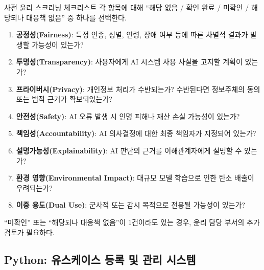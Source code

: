 \begin{practicaltool}{사전 윤리 스크리닝 체크리스트}
각 항목에 대해 ``해당 없음 / 확인 완료 / 미확인 / 해당되나 대응책 없음'' 중 하나를 선택한다.
\begin{enumerate}
    \item \textbf{공정성(Fairness)}: 특정 인종, 성별, 연령, 장애 여부 등에 따른 차별적 결과가 발생할 가능성이 있는가?
    \item \textbf{투명성(Transparency)}: 사용자에게 AI 시스템 사용 사실을 고지할 계획이 있는가?
    \item \textbf{프라이버시(Privacy)}: 개인정보 처리가 수반되는가? 수반된다면 정보주체의 동의 또는 법적 근거가 확보되었는가?
    \item \textbf{안전성(Safety)}: AI 오류 발생 시 인명 피해나 재산 손실 가능성이 있는가?
    \item \textbf{책임성(Accountability)}: AI 의사결정에 대한 최종 책임자가 지정되어 있는가?
    \item \textbf{설명가능성(Explainability)}: AI 판단의 근거를 이해관계자에게 설명할 수 있는가?
    \item \textbf{환경 영향(Environmental Impact)}: 대규모 모델 학습으로 인한 탄소 배출이 우려되는가?
    \item \textbf{이중 용도(Dual Use)}: 군사적 또는 감시 목적으로 전용될 가능성이 있는가?
\end{enumerate}
``미확인'' 또는 ``해당되나 대응책 없음''이 1건이라도 있는 경우, 윤리 담당 부서의 추가 검토가 필요하다.
\end{practicaltool}

\subsection{Python: 유스케이스 등록 및 관리 시스템}
\label{sec:8.2.4}


